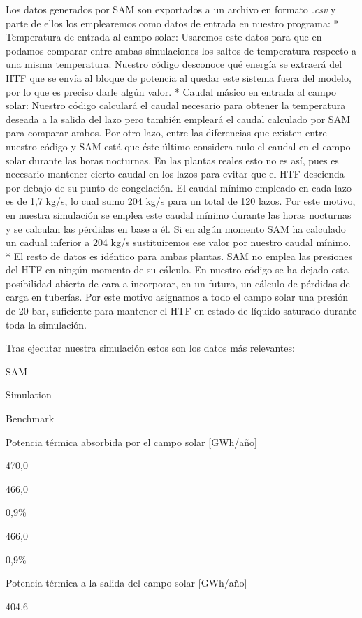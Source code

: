 \documentclass[11pt]{article}
\begin{document}
Los datos generados por SAM son exportados a un archivo en formato
\emph{.csv} y parte de ellos los emplearemos como datos de entrada en
nuestro programa: * Temperatura de entrada al campo solar: Usaremos este
datos para que en podamos comparar entre ambas simulaciones los saltos
de temperatura respecto a una misma temperatura. Nuestro código
desconoce qué energía se extraerá del HTF que se envía al bloque de
potencia al quedar este sistema fuera del modelo, por lo que es preciso
darle algún valor. * Caudal másico en entrada al campo solar: Nuestro
código calculará el caudal necesario para obtener la temperatura deseada
a la salida del lazo pero también empleará el caudal calculado por SAM
para comparar ambos. Por otro lazo, entre las diferencias que existen
entre nuestro código y SAM está que éste último considera nulo el caudal
en el campo solar durante las horas nocturnas. En las plantas reales
esto no es así, pues es necesario mantener cierto caudal en los lazos
para evitar que el HTF descienda por debajo de su punto de congelación.
El caudal mínimo empleado en cada lazo es de 1,7 kg/s, lo cual sumo 204
kg/s para un total de 120 lazos. Por este motivo, en nuestra simulación
se emplea este caudal mínimo durante las horas nocturnas y se calculan
las pérdidas en base a él. Si en algún momento SAM ha calculado un
cadual inferior a 204 kg/s sustituiremos ese valor por nuestro caudal
mínimo. * El resto de datos es idéntico para ambas plantas. SAM no
emplea las presiones del HTF en ningún momento de su cálculo. En nuestro
código se ha dejado esta posibilidad abierta de cara a incorporar, en un
futuro, un cálculo de pérdidas de carga en tuberías. Por este motivo
asignamos a todo el campo solar una presión de 20 bar, suficiente para
mantener el HTF en estado de líquido saturado durante toda la
simulación.

Tras ejecutar nuestra simulación estos son los datos más relevantes:

SAM

{Simulation}

{Benchmark}

Potencia térmica absorbida por el campo solar {[}GWh/año{]}

470,0

466,0

0,9\%

466,0

0,9\%

Potencia térmica a la salida del campo solar {[}GWh/año{]}

404,6
\end{document}
